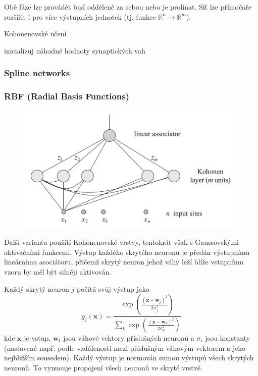 \documentclass[11pt]{report} %
\newcommand{\R}{\mathbb{R}}
\renewcommand{\vec}[1]{\mathbf{#1}}
\numberwithin{equation}{section}
\begin{document}
Obě fáze lze provádět buď odděleně za sebou nebo je prolínat. Síť lze přímočaře rozšířit i pro více výstupních jednotek (tj. funkce $\R^n \to \R^m$).

\bigskip
\begin{algorithm}[H]
	\caption{Kohonenovské učení}
	\begin{algorithmic}[1]
			\State inicializuj náhodné hodnoty synaptických vah
			\State
		\EndFunction
	\end{algorithmic}
\end{algorithm}	
\subsubsection{Spline networks}

\subsubsection{RBF (Radial Basis Functions)}
\begin{figure}[h]
	\centering
	\includegraphics[scale=0.7]{img/rbf_1.png}
\end{figure}
Další varianta použítí Kohonenovské vrstvy, tentokrát však s Gaussovskými aktivačními funkcemi. Výstup každého skrytého neuronu je předán výstupnímu lineárnímu asociátoru, přičemž skrytý neuron jehož váhy leží blíže vstupnímu vzoru by měl být silněji aktivován.

Každý skrytý neuron $j$ počítá svůj výstup jako
$$g_j(\vec{x}) = \frac{\exp\left(\frac{(\vec{x} - \vec{w}_j)^2}{2\sigma_j^2} \right)}{\sum\limits_k \exp\left(\frac{(\vec{x} - \vec{w}_k)^2}{2\sigma_k^2} \right)}$$
kde $\vec{x}$ je vstup, $\vec{w_i}$ jsou váhové vektory příslušných neuronů a $\sigma_i$ jsou konstanty (nastavené např. podle vzdálenosti mezi příslušným váhovým vektorem a jeho nejbližším sousedem). Každý výstup je normován sumou výstupů všech skrytých neuronů. To vynucuje propojení všech neuronů ve skryté vrstvě.
\end{document}
